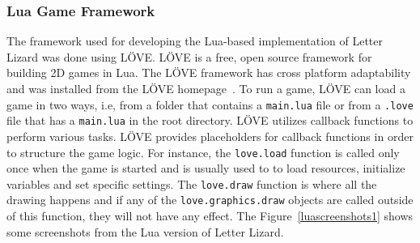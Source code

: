 \subsubsection{Lua Game Framework}
The framework used for developing the Lua-based implementation of Letter Lizard was done using L\"OVE. L\"OVE is a free, open source framework for building 2D games in Lua. The L\"OVE framework has cross platform adaptability and was installed from the L\"OVE homepage~\cite{about_love}. To run a game, L\"OVE can load a game in two ways, i.e, from a folder that contains a \texttt{main.lua} file or from a \texttt{.love} file that has a \texttt{main.lua} in the root directory. L\"OVE utilizes callback functions to perform various tasks. L\"OVE provides placeholders for callback functions in order to structure the game logic. For instance, the \texttt{love.load} function is called only once when the game is started and is usually used to to load resources, initialize variables and set specific settings. The \texttt{love.draw} function is where all the drawing happens and if any of the \texttt{love.graphics.draw} objects are called outside of this function, they will not have any effect. The Figure~\ref{luascreenshots1} shows some screenshots from the Lua version of Letter Lizard.

